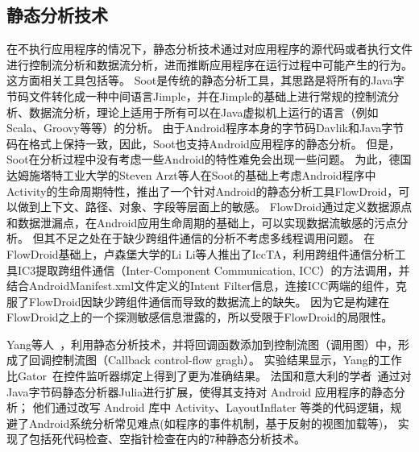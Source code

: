\subsection{静态分析技术}

在不执行应用程序的情况下，静态分析技术通过对应用程序的源代码或者执行文件进行控制流分析和数据流分析，进而推断应用程序在运行过程中可能产生的行为。
这方面相关工具包括\cite{vallee1999soot,arzt2014flowdroid,AmanDroid,iccta,androguard:online}等。
Soot\cite{vallee1999soot}是传统的静态分析工具，其思路是将所有的Java字节码文件转化成一种中间语言Jimple，并在Jimple的基础上进行常规的控制流分析、数据流分析，理论上适用于所有可以在Java虚拟机上运行的语言（例如Scala、Groovy等等）的分析。
由于Android程序本身的字节码Davlik和Java字节码在格式上保持一致，因此，Soot也支持Android应用程序的静态分析。
但是，Soot在分析过程中没有考虑一些Android的特性难免会出现一些问题。
为此，德国达姆施塔特工业大学的Steven Arzt等人在Soot的基础上考虑Android程序中Activity的生命周期特性，推出了一个针对Android的静态分析工具FlowDroid\cite{arzt2014flowdroid}，可以做到上下文、路径、对象、字段等层面上的敏感。
FlowDroid通过定义数据源点和数据泄漏点，在Android应用生命周期的基础上，可以实现数据流敏感的污点分析。
但其不足之处在于缺少跨组件通信的分析不考虑多线程调用问题。
在FlowDroid基础上，卢森堡大学的Li Li等人推出了IccTA\cite{iccta}，利用跨组件通信分析工具IC3提取跨组件通信（Inter-Component Communication, ICC）的方法调用，并结合AndroidManifest.xml文件定义的Intent Filter信息，连接ICC两端的组件，克服了FlowDroid因缺少跨组件通信而导致的数据流上的缺失。
因为它是构建在FlowDroid之上的一个探测敏感信息泄露的，所以受限于FlowDroid的局限性。

Yang等人~\cite{yang2015static}，利用静态分析技术，并将回调函数添加到控制流图（调用图）中，形成了回调控制流图（Callback control-flow gragh）。
实验结果显示，Yang的工作比Gator~\cite{rountev2014static}在控件监听器绑定上得到了更为准确结果。
法国和意大利的学者~\cite{payet2012static}通过对Java字节码静态分析器Julia进行扩展，使得其支持对 Android 应用程序的静态分析；
他们通过改写 Android 库中 Activity、LayoutInflater 等类的代码逻辑，规避了Android系统分析常见难点(如程序的事件机制，基于反射的视图加载等)，
实现了包括死代码检查、空指针检查在内的7种静态分析技术。





